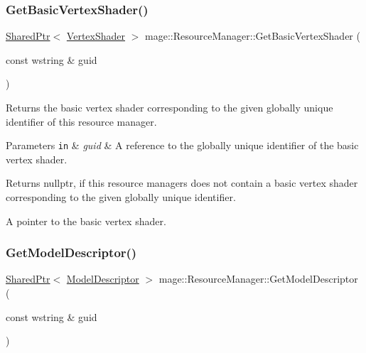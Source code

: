 \subsubsection{\texorpdfstring{Get\+Basic\+Vertex\+Shader()}{GetBasicVertexShader()}}
{\footnotesize\ttfamily \hyperlink{namespacemage_a1e01ae66713838a7a67d30e44c67703e}{Shared\+Ptr}$<$ \hyperlink{classmage_1_1_vertex_shader}{Vertex\+Shader} $>$ mage\+::\+Resource\+Manager\+::\+Get\+Basic\+Vertex\+Shader (\begin{DoxyParamCaption}\item[{const wstring \&}]{guid }\end{DoxyParamCaption})\hspace{0.3cm}{\ttfamily [noexcept]}}

Returns the basic vertex shader corresponding to the given globally unique identifier of this resource manager.


\begin{DoxyParams}[1]{Parameters}
\mbox{\tt in}  & {\em guid} & A reference to the globally unique identifier of the basic vertex shader. \\
\hline
\end{DoxyParams}
\begin{DoxyReturn}{Returns}
{\ttfamily nullptr}, if this resource managers does not contain a basic vertex shader corresponding to the given globally unique identifier. 

A pointer to the basic vertex shader. 
\end{DoxyReturn}
\hypertarget{classmage_1_1_resource_manager_a93d34fd42062d9901435c8c469e7ecdf}{}\label{classmage_1_1_resource_manager_a93d34fd42062d9901435c8c469e7ecdf} 
\subsubsection{\texorpdfstring{Get\+Model\+Descriptor()}{GetModelDescriptor()}}
{\footnotesize\ttfamily \hyperlink{namespacemage_a1e01ae66713838a7a67d30e44c67703e}{Shared\+Ptr}$<$ \hyperlink{classmage_1_1_model_descriptor}{Model\+Descriptor} $>$ mage\+::\+Resource\+Manager\+::\+Get\+Model\+Descriptor (\begin{DoxyParamCaption}\item[{const wstring \&}]{guid }\end{DoxyParamCaption})\hspace{0.3cm}{\ttfamily [noexcept]}}

